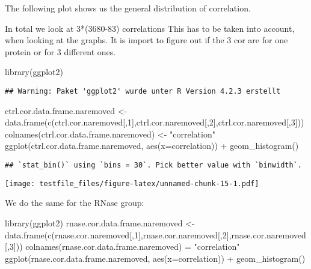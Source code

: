 \documentclass[
]{article}
\newenvironment{Shaded}{\begin{snugshade}}{\end{snugshade}}
\newcommand{\AttributeTok}[1]{\textcolor[rgb]{0.77,0.63,0.00}{#1}}
\newcommand{\DecValTok}[1]{\textcolor[rgb]{0.00,0.00,0.81}{#1}}
\newcommand{\FunctionTok}[1]{\textcolor[rgb]{0.00,0.00,0.00}{#1}}
\newcommand{\NormalTok}[1]{#1}
\newcommand{\OtherTok}[1]{\textcolor[rgb]{0.56,0.35,0.01}{#1}}
\newcommand{\SpecialCharTok}[1]{\textcolor[rgb]{0.00,0.00,0.00}{#1}}
\newcommand{\StringTok}[1]{\textcolor[rgb]{0.31,0.60,0.02}{#1}}
\begin{document}
The following plot shows us the general distribution of correlation.

In total we look at 3*(3680-83) correlations This has to be taken into
account, when looking at the graphs. It is import to figure out if the 3
cor are for one protein or for 3 different ones.

\begin{Shaded}
\begin{Highlighting}[]
\FunctionTok{library}\NormalTok{(ggplot2)}
\end{Highlighting}
\end{Shaded}

\begin{verbatim}
## Warning: Paket 'ggplot2' wurde unter R Version 4.2.3 erstellt
\end{verbatim}

\begin{Shaded}
\begin{Highlighting}[]
\NormalTok{ctrl.cor.data.frame.naremoved }\OtherTok{\textless{}{-}} \FunctionTok{data.frame}\NormalTok{(}\FunctionTok{c}\NormalTok{(ctrl.cor.naremoved[,}\DecValTok{1}\NormalTok{],ctrl.cor.naremoved[,}\DecValTok{2}\NormalTok{],ctrl.cor.naremoved[,}\DecValTok{3}\NormalTok{]))}
\FunctionTok{colnames}\NormalTok{(ctrl.cor.data.frame.naremoved) }\OtherTok{\textless{}{-}} \StringTok{"correlation"}
\FunctionTok{ggplot}\NormalTok{(ctrl.cor.data.frame.naremoved, }\FunctionTok{aes}\NormalTok{(}\AttributeTok{x=}\NormalTok{correlation)) }\SpecialCharTok{+} \FunctionTok{geom\_histogram}\NormalTok{()}
\end{Highlighting}
\end{Shaded}

\begin{verbatim}
## `stat_bin()` using `bins = 30`. Pick better value with `binwidth`.
\end{verbatim}

\texttt{[image: testfile\_files/figure-latex/unnamed-chunk-15-1.pdf]}

We do the same for the RNase group:

\begin{Shaded}
\begin{Highlighting}[]
\FunctionTok{library}\NormalTok{(ggplot2)}
\NormalTok{rnase.cor.data.frame.naremoved }\OtherTok{\textless{}{-}} \FunctionTok{data.frame}\NormalTok{(}\FunctionTok{c}\NormalTok{(rnase.cor.naremoved[,}\DecValTok{1}\NormalTok{],rnase.cor.naremoved[,}\DecValTok{2}\NormalTok{],rnase.cor.naremoved[,}\DecValTok{3}\NormalTok{]))}
\FunctionTok{colnames}\NormalTok{(rnase.cor.data.frame.naremoved) }\OtherTok{=} \StringTok{"correlation"}
\FunctionTok{ggplot}\NormalTok{(rnase.cor.data.frame.naremoved, }\FunctionTok{aes}\NormalTok{(}\AttributeTok{x=}\NormalTok{correlation)) }\SpecialCharTok{+} \FunctionTok{geom\_histogram}\NormalTok{()}
\end{Highlighting}
\end{Shaded}
\end{document}
